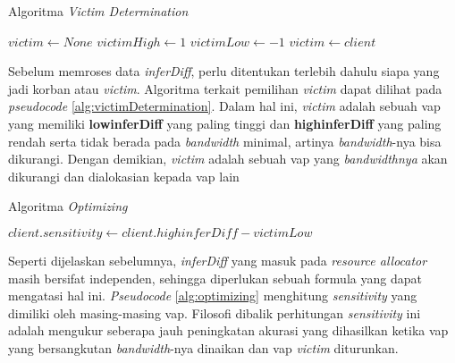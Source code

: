         \begin{algorithm}[tbh]
        \caption{Algoritma \textit{Victim Determination}}\label{alg:victimDetermination}
        \begin{algorithmic}[1]
        \State $victim \gets None$
        \State $victimHigh \gets 1$
        \State $victimLow \gets -1$
        \State $victim \gets client$
        \EndIf
        \EndIf
        \EndIf
        \EndFor
        \EndProcedure
        \end{algorithmic}
        \end{algorithm}

        Sebelum memroses data \textit{inferDiff}, perlu ditentukan terlebih dahulu siapa yang jadi korban atau \textit{victim}. Algoritma terkait pemilihan \textit{victim} dapat dilihat pada \textit{pseudocode} \ref{alg:victimDetermination}.
        Dalam hal ini, \textit{victim} adalah sebuah \gls{vap} yang memiliki \textbf{lowinferDiff} yang paling tinggi dan \textbf{highinferDiff} yang paling rendah
        serta tidak berada pada \textit{bandwidth} minimal, artinya \textit{bandwidth}-nya bisa dikurangi. Dengan demikian, \textit{victim} adalah sebuah \gls{vap} yang \textit{bandwidthnya} akan dikurangi dan dialokasian kepada \gls{vap} lain


        \begin{algorithm}[tbh]
        \caption{Algoritma \textit{Optimizing}}\label{alg:optimizing}
        \begin{algorithmic}[1]
        \State $client.sensitivity \gets client.highinferDiff - victimLow$
        \EndFor
        \EndProcedure
        \end{algorithmic}
        \end{algorithm}
        
        Seperti dijelaskan sebelumnya, \textit{inferDiff} yang masuk pada \textit{resource allocator} masih bersifat independen, sehingga diperlukan sebuah formula yang dapat mengatasi
        hal ini. \textit{Pseudocode} \ref{alg:optimizing} menghitung \textit{sensitivity} yang dimiliki oleh masing-masing \gls{vap}. Filosofi dibalik perhitungan \textit{sensitivity}
        ini adalah mengukur seberapa jauh peningkatan akurasi yang dihasilkan ketika \gls{vap} yang bersangkutan \textit{bandwidth}-nya dinaikan dan \gls{vap} \textit{victim} diturunkan.



